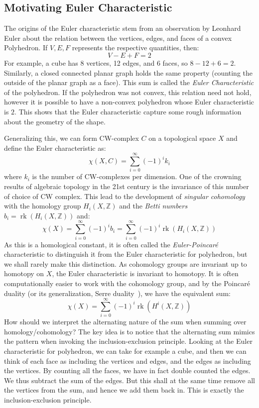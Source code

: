 \documentclass{book}
\newcommand{\Z}{{\mathbb{Z}}}
\newcommand{\rk}{{\operatorname{rk}}}
\begin{document}
\subsection{Motivating Euler Characteristic}

The origins of the Euler characteristic stem from an observation by Leonhard Euler about the relation between
the vertices, edges, and faces of a convex Polyhedron. If $V,E,F$ represents the respective quantities, then:
\[
  V-E+F = 2
\]
For example, a cube has 8 vertices, 12 edges, and 6 faces, so $8-12+6 = 2$. Similarly, a closed connected
planar graph holds the same property (counting the outside of the planar graph as a face). This sum is called
the \emph{Euler Characteristic} of the polyhedron. If the polyhedron was not convex, this relation need not
hold, however it is possible to have a non-convex polyhedron whose Euler characteristic is $2$. This shows
that the Euler characteristic capture some rough information about the geometry of the shape.


Generalizing this, we can form CW-complex $C$ on a topological space $X$ and define the Euler characteristic
as:
\[
  \chi(X, C) = \sum_{i=0}^\infty (-1)^ik_i
\]
where $k_i$ is the number of CW-complexes per dimension. One of the crowning results of algebraic topology in
the 21st century is the invariance of this number of choice of CW complex. This lead to the development of
\emph{singular cohomology} with the homology group $H_i(X, \Z)$ and the \emph{Betti numbers} $b_i = \rk(H_i(X,
\Z))$ and:
\[
  \chi(X) = \sum_{i=0}^\infty (-1)^ib_i = \sum_{i=0}^\infty (-1)^i\rk(H_i(X, \Z))
\]
As this is a homological constant, it is often called the \emph{Euler-Poincar\'e} characteristic to
distinguish it from the Euler characteristic for polyhedron, but we shall rarely make this distinction. As
cohomology groups are invariant up to homotopy on $X$, the Euler characteristic is invariant to homotopy. It
is often computationally easier to work with the cohomology group, and by the Poincar\'e duality
\cite[section~4.3]{NateAlgTop} (or its generalization, Serre duality~\cite[section~5.3]{NateAlgGeo}), we have
the equivalent sum:
\[
  \chi(X) =  \sum_{i=0}^\infty (-1)^i\rk(H^i(X, \Z))
\]
How should we interpret the alternating nature of the sum when summing over homology/cohomology? The key idea
is to notice that the alternating sum mimics the pattern when invoking the inclusion-exclusion principle.
Looking at the Euler characteristic for polyhedron, we can take for example a cube, and then we can think of
each face as including the vertices and edges, and the edges as including the vertices. By counting all the
faces, we have in fact double counted the edges. We thus subtract the sum of the edges. But this shall at the
same time remove all the vertices from the sum, and hence we add them back in. This is exactly the
inclusion-exclusion principle.
\end{document}

